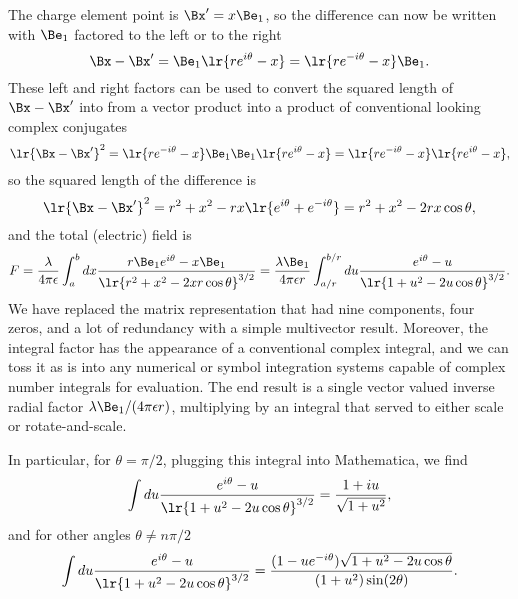 The charge element point is \( \Bx' = x \Be_1 \), so the difference can now be written with \( \Be_1 \) factored to the left or to the right
\begin{equation}\label{eqn:linecharge:20}
\Bx - \Bx'
= \Be_1\lr{ r e^{i\theta} - x }
= \lr{ r e^{-i\theta} - x } \Be_1.
\end{equation}
These left and right factors can be used to convert the squared length of \( \Bx - \Bx' \) into from a vector product into a product of conventional looking complex conjugates
\begin{dmath}\label{eqn:linecharge:40}
\lr{ \Bx - \Bx' }^2
= \lr{ r e^{-i\theta} - x } \Be_1 \Be_1\lr{ r e^{i\theta} - x }
= \lr{ r e^{-i\theta} - x } \lr{ r e^{i\theta} - x },
\end{dmath}
so the squared length of the difference is
\begin{dmath}\label{eqn:linecharge:300}
\lr{ \Bx - \Bx' }^2
= r^2 + x^2 - r x \lr{ e^{i\theta} + e^{-i\theta} }
= r^2 + x^2 - 2 r x \cos\theta,
\end{dmath}
and the total (electric) field is
\begin{dmath}\label{eqn:linecharge:60}
F
= \frac{\lambda}{4 \pi \epsilon} \int_a^b dx \frac{ r \Be_1 e^{i\theta} - x \Be_1 }{ \lr{ r^2 + x^2 - 2 x r \cos\theta }^{3/2} }
= \frac{\lambda \Be_1}{4 \pi \epsilon r} \int_{a/r}^{b/r} du \frac{ e^{i\theta} - u }{ \lr{ 1 + u^2 - 2 u \cos\theta }^{3/2} }.
\end{dmath}
We have replaced the matrix representation that had nine components, four zeros, and a lot of redundancy with a simple multivector result.
Moreover, the integral factor has the appearance of a conventional complex integral, and we can toss it as is into any numerical or symbol integration systems capable of complex number integrals for evaluation.
The end result is a single vector valued inverse radial factor \( \lambda \Be_1/ (4 \pi \epsilon r) \), multiplying by an integral that served to either scale or rotate-and-scale.

In particular, for \( \theta = \pi/2 \), plugging this integral into Mathematica, we find
\begin{dmath}\label{eqn:linecharge:80}
\int
du \frac{ e^{i\theta} - u }{ \lr{ 1 + u^2 - 2 u \cos\theta }^{3/2} }
= \frac{1 + i u}{\sqrt{1 + u^2}},
\end{dmath}
and for other angles \( \theta \neq n \pi/2 \)
\begin{dmath}\label{eqn:linecharge:100}
\int
du \frac{ e^{i\theta} - u }{ \lr{ 1 + u^2 - 2 u \cos\theta }^{3/2} }
= \frac{(1 -u e^{-i\theta}) \sqrt{1 + u^2 - 2 u \cos\theta}}{(1 + u^2) \sin(2\theta)}.
\end{dmath}

